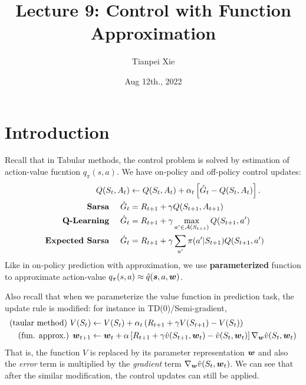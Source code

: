 \documentclass[11pt]{article}
\begin{document}
\title{Lecture 9: Control with Function Approximation}
\author{Tianpei Xie}
\date{ Aug 12th., 2022 }
\maketitle
\tableofcontents
\newpage
\section{Introduction}
Recall that in Tabular methods, the control problem is solved by estimation of action-value fucntion $q_{\pi}(s, a)$. We have on-policy and off-policy control updates:
\begin{align*}
Q(S_{t}, A_{t}) &\leftarrow Q(S_{t}, A_{t}) + \alpha_{t}\left[\hat{G}_{t}  - Q(S_{t}, A_{t})\right].  \\
 \text{  \textbf{Sarsa} }\quad\hat{G}_{t} &= R_{t+1} + \gamma Q(S_{t+1}, A_{t+1}) \\
\text{  \textbf{Q-Learning} }\quad\hat{G}_{t} &=  R_{t+1} + \gamma \max_{a'\in {\mathcal A}(S_{t+1})}Q(S_{t+1}, a')  \\
 \text{  \textbf{Expected Sarsa} }\quad\hat{G}_{t} &= R_{t+1} + \gamma\sum_{a'}\pi(a'|S_{t+1})Q(S_{t+1}, a') 
\end{align*} Like in on-policy prediction with approximation, we use \textbf{parameterized} function to approximate action-value $q_{\pi}(s, a)\approx \hat{q}(\boldsymbol{s}, a, \boldsymbol{w})$.

Also recall that when we parameterize the value function in prediction task, the update rule is modified: for instance in TD(0)/Semi-gradient, 
\begin{align*}
\text{(taular method) }V(S_{t}) &\leftarrow V(S_{t}) + \alpha_{t}\left(R_{t+1} + \gamma V(S_{t+1})  - V(S_{t})\right) \nonumber\\
\text{(fun. approx.) }\boldsymbol{w}_{t+1} &\leftarrow  \boldsymbol{w}_{t} + \alpha \left[R_{t+1} + \gamma \hat{v}(S_{t+1}, \boldsymbol{w}_{t}) - \hat{v}(S_{t}, \boldsymbol{w}_{t})\right] \nabla_{\boldsymbol{w}}{\hat{v}(S_{t}, \boldsymbol{w}_{t})}
\end{align*} That is, the function $V$ is replaced by its parameter representation $\boldsymbol{w}$ and also the \emph{error} term is multiplied by the \emph{gradient} term $\nabla_{\boldsymbol{w}}{\hat{v}(S_{t}, \boldsymbol{w}_{t})}$. We can see that after the similar modification, the control updates can still be applied. 
\end{document}
